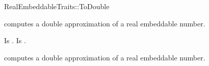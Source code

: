 \begin{ccRefFunctionObjectConcept}{RealEmbeddableTraits::ToDouble}

\ccDefinition

 computes a double approximation of a real
embeddable number. 
 
\ccRefines 



\ccTypes
{} 
        { Is .}
        { Is .}

\ccOperations
{}

        { computes a double approximation of a real embeddable number. }


\ccSeeAlso

\\

\end{ccRefFunctionObjectConcept} 